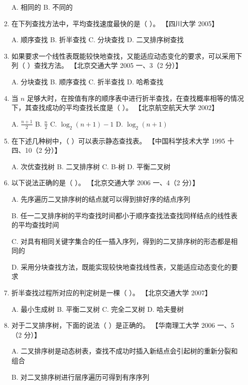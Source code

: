 \documentclass[lang=cn,newtx,10pt,scheme=chinese]{../../elegantbook}
\begin{document}
\begin{enumerate}
    A. 相同的 \quad B. 不同的  

    \item 在下列查找方法中，平均查找速度最快的是（ ）。  
    【四川大学 2005】  

    A. 顺序查找 \quad B. 折半查找 \quad C. 分块查找 \quad D. 二叉排序树查找  

    \item 如果要求一个线性表既能较快地查找，又能适应动态变化的要求，可以采用下列（ ）查找方法。  
    【北京交通大学 2005 一、3（2 分）】  

    A. 分块查找 \quad B. 顺序查找 \quad C. 折半查找 \quad D. 哈希查找  

    \item 当 $n$ 足够大时，在按值有序的顺序表中进行折半查找，在查找概率相等的情况下，其查找成功的平均查找长度是（ ）。  
    【北京航空航天大学 2002】  

    A. $\frac{n+1}{2}$ \quad B. $\frac{n}{2}$ \quad C. $\log_2(n+1) - 1$ \quad D. $\log_2(n+1)$  

    \item 在下述几种树中，（ ）可以表示静态查找表。  
    【中国科学技术大学 1995 十四、10（2 分）】  

    A. 次优查找树 \quad B. 二叉排序树 \quad C. B-树 \quad D. 平衡二叉树  

    \item 以下说法正确的是（ ）。  
    【北京交通大学 2006 一、4（2 分）】  

    A. 先序遍历二叉排序树的结点就可以得到排好序的结点序列 

    B. 任一二叉排序树的平均查找时间都小于顺序查找法查找同样结点的线性表的平均查找时间  

    C. 对具有相同关键字集合的任一插入序列，得到的二叉排序树的形态都是相同的  

    D. 采用分块查找方法，既能实现较快地查找线性表，又能适应动态变化的要求  

    \item 折半查找过程所对应的判定树是一棵（ ）。  
    【北京交通大学 2007】  

    A. 最小生成树 \quad B. 平衡二叉树 \quad C. 完全二叉树 \quad D. 哈夫曼树  

    \item 对于二叉排序树，下面的说法（ ）是正确的。  
    【华南理工大学 2006 一、5（2 分）】  

    A. 二叉排序树是动态树表，查找不成功时插入新结点会引起树的重新分裂和组合  

    B. 对二叉排序树进行层序遍历可得到有序序列  


\end{enumerate}
\end{document}
